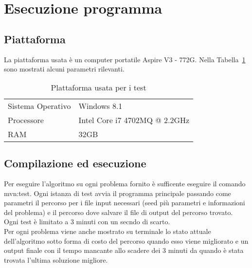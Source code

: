 \chapter*{Esecuzione programma}
\label{cha_esecuzione}

\section*{Piattaforma}
\label{sec_piattaforma}
La piattaforma usata è un computer portatile Aspire V3 - 772G. Nella Tabella~\ref{tab_statpc} sono mostrati alcuni parametri rilevanti.

\begin{table}[htb]
  \caption{Plattaforma usata per i test\label{tab_statpc}}
  \centering
\begin{tabular}{ll}
  \toprule
  Sistema Operativo		& Windows 8.1 \\
  Processore			& Intel Core i7 4702MQ @ 2.2GHz \\
  RAM				& 32GB \\
  \bottomrule
\end{tabular}
\end{table}

\section*{Compilazione ed esecuzione}
\label{sec_comp_exec}
Per eseguire l'algoritmo su ogni problema fornito è sufficente eseguire il comando mvn:test.
Ogni istanza di test avvia il programma principale passando come parametri il percorso per i 
file input necessari (seed più parametri e informazioni del problema) e il percorso dove salvare
il file di output del percorso trovato. \\
Ogni test è limitato a 3 minuti con un secndo di scarto. \\
Per ogni problema viene anche mostrato su terminale lo stato attuale dell'algoritmo sotto 
forma di costo del percorso quando esso viene migliorato e un output finale con il tempo 
mancante allo scadere dei 3 minuti da quando è stata trovata l'ultima soluzione migliore.


